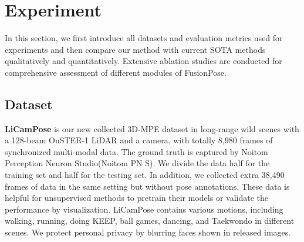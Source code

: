\documentclass[letterpaper]{article} %
\begin{document}
\section{Experiment}
In this section, we first introduce all datasets and evaluation metrics used for experiments and then compare our method with current SOTA methods qualitatively and quantitatively. Extensive ablation studies are conducted for comprehensive assessment of different modules of FusionPose. 






\subsection{Dataset}
\noindent \textbf{LiCamPose} is our new collected 3D-MPE dataset in long-range wild scenes with a 128-beam OuSTER-1 LiDAR and a camera, with totally 8,980 frames of synchronized multi-modal data. The ground truth is captured by Noitom Perception Neuron Studio(Noitom PN S). We divide the data half for the training set and half for the testing set. In addition, we collected extra 38,490 frames of data in the same setting but without pose annotations. These data is helpful for unsupervised methods to pretrain their models or validate the performance by visualization. LiCamPose contains various motions, including walking, running, doing KEEP, ball games, dancing, and Taekwondo in different scenes. We protect personal privacy by blurring faces shown in released images.


\end{document}
